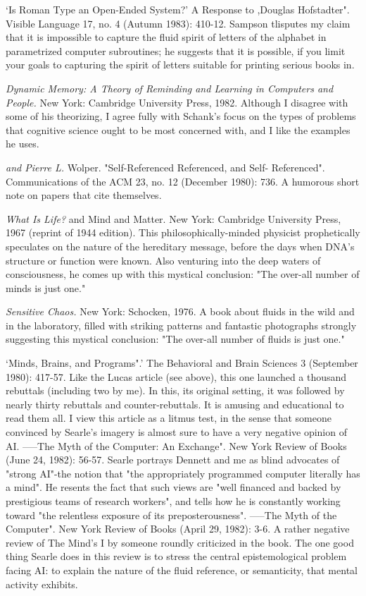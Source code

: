  `Is Roman Type an Open-Ended System?' A Response to ,Douglas Hofstadter". Visible Language 17, no. 4 (Autumn 1983): 410-12. Sampson tlisputes my claim that it is impossible to capture the fluid spirit of letters of the alphabet in parametrized computer subroutines; he suggests that it is possible, if you limit your goals to capturing the spirit of letters suitable for printing serious books in.

 {\sl Dynamic Memory: A Theory of Reminding and Learning in Computers and People.} New York: Cambridge University Press, 1982. Although I disagree with some of his theorizing, I agree fully with Schank's focus on the types of problems that cognitive science ought to be most concerned with, and I like the examples he uses.

 {\sl and Pierre L.} Wolper. "Self-Referenced Referenced, and Self- Referenced". Communications of the ACM 23, no. 12 (December 1980): 736. A humorous short note on papers that cite themselves.

 {\sl What Is Life?} and Mind and Matter. New York: Cambridge University Press, 1967 (reprint of 1944 edition). This philosophically-minded physicist prophetically speculates on the nature of the hereditary message, before the days when DNA's structure or function were known. Also venturing into the deep waters of consciousness, he comes up with this mystical conclusion: "The over-all number of minds is just one."

 {\sl Sensitive Chaos.} New York: Schocken, 1976. A book about fluids in the wild and in the laboratory, filled with striking patterns and fantastic photographs strongly suggesting this mystical conclusion: "The over-all number of fluids is just one."

 `Minds, Brains, and Programs".' The Behavioral and Brain Sciences 3 (September 1980): 417-57. Like the Lucas article (see above), this one launched a thousand rebuttals (including two by me). In this, its original setting, it was followed by nearly thirty rebuttals and counter-rebuttals. It is amusing and educational to read them all. I view this article as a litmus test, in the sense that someone convinced by Searle's imagery is almost sure to have a very negative opinion of AI. -----The Myth of the Computer: An Exchange". New York Review of Books (June 24, 1982): 56-57. Searle portrays Dennett and me as blind advocates of "strong AI"-the notion that "the appropriately programmed computer literally has a mind". He resents the fact that such views are "well financed and backed by prestigious teams of research workers", and tells how he is constantly working toward "the relentless exposure of its preposterousness". -----The Myth of the Computer". New York Review of Books (April 29, 1982): 3-6. A rather negative review of The Mind's I by someone roundly criticized in the book. The one good thing Searle does in this review is to stress the central epistemological problem facing AI: to explain the nature of the fluid reference, or semanticity, that mental activity exhibits.

